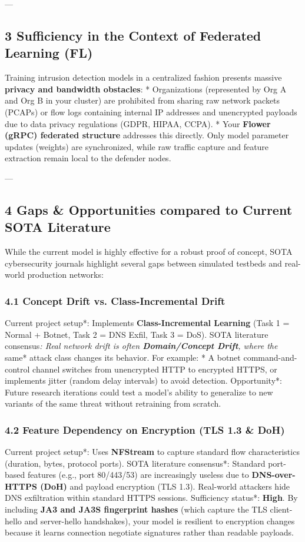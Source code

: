 \documentclass[conference]{IEEEtran}
\begin{document}
---


\subsection{3 Sufficiency in the Context of Federated Learning (FL)}

Training intrusion detection models in a centralized fashion presents massive \textbf{privacy and bandwidth obstacles}:
* Organizations (represented by Org A and Org B in your cluster) are prohibited from sharing raw network packets (PCAPs) or flow logs containing internal IP addresses and unencrypted payloads due to data privacy regulations (GDPR, HIPAA, CCPA).
* Your \textbf{Flower (gRPC) federated structure} addresses this directly. Only model parameter updates (weights) are synchronized, while raw traffic capture and feature extraction remain local to the defender nodes.

---


\subsection{4 Gaps & Opportunities compared to Current SOTA Literature}

While the current model is highly effective for a robust proof of concept, SOTA cybersecurity journals highlight several gaps between simulated testbeds and real-world production networks:


\subsubsection{4.1 Concept Drift vs. Class-Incremental Drift}
\textit{ }Current project setup*: Implements \textbf{Class-Incremental Learning} (Task 1 = Normal + Botnet, Task 2 = DNS Exfil, Task 3 = DoS).
\textit{ }SOTA literature consensus\textit{: Real network drift is often \textbf{Domain/Concept Drift}, where the }same* attack class changes its behavior. For example:
  * A botnet command-and-control channel switches from unencrypted HTTP to encrypted HTTPS, or implements jitter (random delay intervals) to avoid detection.
  \textit{ }Opportunity*: Future research iterations could test a model's ability to generalize to new variants of the same threat without retraining from scratch.


\subsubsection{4.2 Feature Dependency on Encryption (TLS 1.3 & DoH)}
\textit{ }Current project setup*: Uses \textbf{NFStream} to capture standard flow characteristics (duration, bytes, protocol ports).
\textit{ }SOTA literature consensus*: Standard port-based features (e.g., port 80/443/53) are increasingly useless due to \textbf{DNS-over-HTTPS (DoH)} and payload encryption (TLS 1.3). Real-world attackers hide DNS exfiltration within standard HTTPS sessions.
\textit{ }Sufficiency status*: \textbf{High}. By including \textbf{JA3 and JA3S fingerprint hashes} (which capture the TLS client-hello and server-hello handshakes), your model is resilient to encryption changes because it learns connection negotiate signatures rather than readable payloads.
\end{document}
